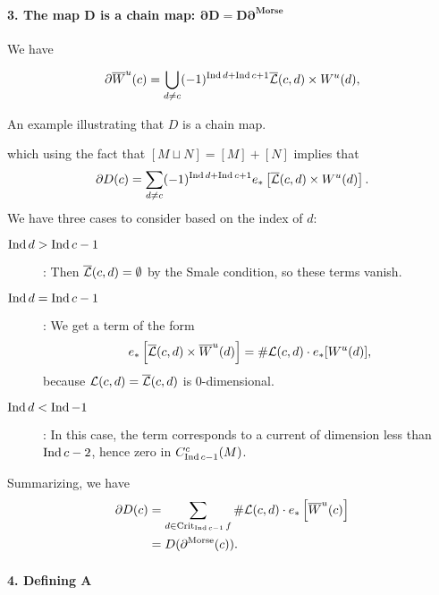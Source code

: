 \begin{myproof}
    \paragraph{3. The map $\bm{D}$ is a chain map:  $\bm{\partial D = D \partial^{\text{Morse}}}$ }
    We have

    \[
        \partial \overline{W}^u(c) = \bigcup_{d \neq c}  (-1)^{\operatorname{Ind} d + \operatorname{Ind} c + 1} \overline{\mathcal L}(c, d) \times  W^u(d),
    \]
    \begin{marginfigure}
        \centering
        \caption{An example illustrating that $D$ is a chain map.}
        \label{fig:d-is-a-chain-map}
    \end{marginfigure}
    which using the fact that $[M \sqcup N] = [M] + [N]$ implies that
    \[
        \partial D(c) = \sum_{d \neq c} (-1)^{\operatorname{Ind} d + \operatorname{Ind} c + 1} e_*\left[\overline{\mathcal L}(c, d) \times  W^u(d)\right]
    .\] 
    We have three cases to consider based on the index of $d$:
    \begin{description}
        \item[$\operatorname{Ind} d > \operatorname{Ind} c-1$]: Then $\overline{\mathcal L}(c, d) = \emptyset$ by the Smale condition, so these terms vanish.
        \item[$\operatorname{Ind} d = \operatorname{Ind} c-1$]: We get a term of the form \[
            e_* \left[\overline{\mathcal L}(c, d) \times \overline{W}^u(d)\right] = \# \mathcal L(c, d) \cdot e_*[W^u(d)],\]
            because $\mathcal L(c, d) = \overline{\mathcal L}(c, d)$ is  $0$-dimensional.
        \item[$\operatorname{Ind} d < \operatorname{Ind} -1$]: In this case, the term corresponds to a current of dimension less than $\operatorname{Ind} c - 2$, hence zero in $C_{\operatorname{Ind} c - 1}^{c}(M)$.
    \end{description}
    Summarizing, we have
    \begin{align*}
        \partial D(c) &= \sum_{d \in \operatorname{Crit}_{\operatorname{Ind} c - 1} f} \# \mathcal L(c, d) \cdot e_* \left[ \overline{W}^u(c) \right] \\
                      &= D(\partial^{\text{Morse}}(c))
    .\end{align*} 

    \paragraph{4. Defining $\bm{A}$}


\end{myproof}
